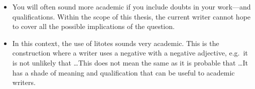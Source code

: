 \begin{itemize}
\item You will often sound more academic if you include doubts in your work---and qualifications. Within the scope of this thesis, the current writer cannot hope to cover all the possible implications of the question.
\item In this context, the use of litotes sounds very academic. This is the construction where a writer uses a negative with a negative adjective, e.g.\ it is not unlikely that \ldots This does not mean the same as it is probable that \ldots It has a shade of meaning and qualification that can be useful to academic writers.
\end{itemize}




